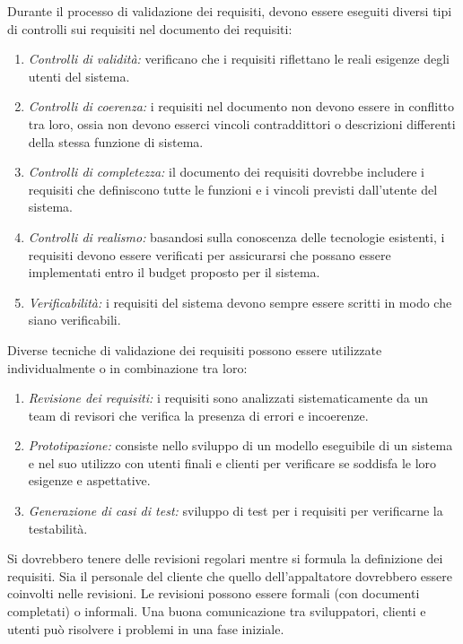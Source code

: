 Durante il processo di validazione dei requisiti, devono essere eseguiti diversi tipi di controlli sui requisiti nel documento dei requisiti:
\begin{enumerate}
    \item \textit{Controlli di validità:} verificano che i requisiti riflettano le reali esigenze degli utenti del sistema.
    \item \textit{Controlli di coerenza:} i requisiti nel documento non devono essere in conflitto tra loro, ossia non devono esserci vincoli contraddittori o descrizioni differenti della stessa funzione di sistema.
    \item \textit{Controlli di completezza:} il documento dei requisiti dovrebbe includere i requisiti che definiscono tutte le funzioni e i vincoli previsti dall’utente del sistema.
    \item \textit{Controlli di realismo:} basandosi sulla conoscenza delle tecnologie esistenti, i requisiti devono essere verificati per assicurarsi che possano essere implementati entro il budget proposto per il sistema.
    \item \textit{Verificabilità:} i requisiti del sistema devono sempre essere scritti in modo che siano verificabili.
\end{enumerate}
Diverse tecniche di validazione dei requisiti possono essere utilizzate individualmente o in combinazione tra loro:
\begin{enumerate}
    \item \textit{Revisione dei requisiti:} i requisiti sono analizzati sistematicamente da un team di revisori che verifica la presenza di errori e incoerenze.
    \item \textit{Prototipazione:} consiste nello sviluppo di un modello eseguibile di un sistema e nel suo utilizzo con utenti finali e clienti per verificare se soddisfa le loro esigenze e aspettative.
    \item \textit{Generazione di casi di test:} sviluppo di test per i requisiti per verificarne la testabilità.
\end{enumerate}
Si dovrebbero tenere delle revisioni regolari mentre si formula la definizione dei requisiti. Sia il personale del cliente che quello dell'appaltatore dovrebbero essere coinvolti nelle revisioni. Le revisioni possono essere formali (con documenti completati) o informali. Una buona comunicazione tra sviluppatori, clienti e utenti può risolvere i problemi in una fase iniziale.


